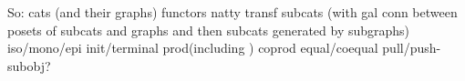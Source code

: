 \documentclass{book}
\begin{document}
	So: cats (and their graphs)     functors    natty transf    subcats (with gal conn between posets of subcats and graphs and then subcats generated by subgraphs)    iso/mono/epi     init/terminal   prod(including ) coprod   equal/coequal    pull/push-subobj?
	
%	
\end{document}
